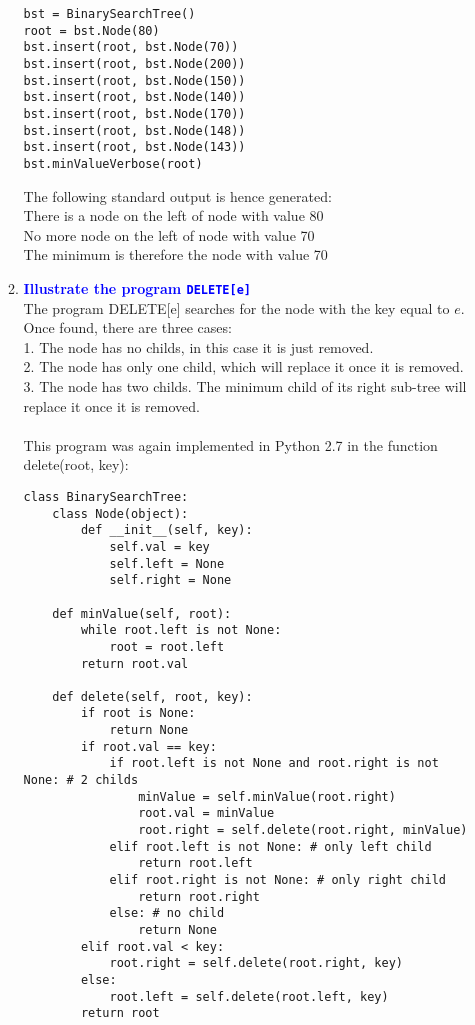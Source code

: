 \documentclass[11pt]{article}
\begin{document}
\begin{enumerate}
\begin{enumerate}
\begin{verbatim}
bst = BinarySearchTree()
root = bst.Node(80)
bst.insert(root, bst.Node(70))
bst.insert(root, bst.Node(200))
bst.insert(root, bst.Node(150))
bst.insert(root, bst.Node(140))
bst.insert(root, bst.Node(170))
bst.insert(root, bst.Node(148))
bst.insert(root, bst.Node(143))
bst.minValueVerbose(root)
        \end{verbatim}
        The following standard output is hence generated:
        \\ There is a node on the left of node with value 80
        \\ No more node on the left of node with value 70
        \\ The minimum is therefore the node with value 70
    \item \textbf{\textcolor{blue}{Illustrate the program {\tt DELETE[e]}}}
        \\ The program DELETE[e] searches for the node with the key equal to $e$.
        \\ Once found, there are three cases:
        \\ 1. The node has no childs, in this case it is just removed.
        \\ 2. The node has only one child, which will replace it once it is removed.
        \\ 3. The node has two childs. The minimum child of its right sub-tree will replace it once it is removed.
        \\\\ This program was again implemented in Python 2.7 in the function delete(root, key):
        \begin{verbatim}
class BinarySearchTree:
    class Node(object):
        def __init__(self, key):
            self.val = key
            self.left = None
            self.right = None
        
    def minValue(self, root):
        while root.left is not None:
            root = root.left
        return root.val
        
    def delete(self, root, key):
        if root is None:
            return None
        if root.val == key:
            if root.left is not None and root.right is not None: # 2 childs
                minValue = self.minValue(root.right)
                root.val = minValue
                root.right = self.delete(root.right, minValue)                    
            elif root.left is not None: # only left child
                return root.left
            elif root.right is not None: # only right child
                return root.right
            else: # no child
                return None
        elif root.val < key:
            root.right = self.delete(root.right, key)
        else:
            root.left = self.delete(root.left, key)
        return root
        

\end{verbatim}
\end{enumerate}
\end{enumerate}
\end{document}
